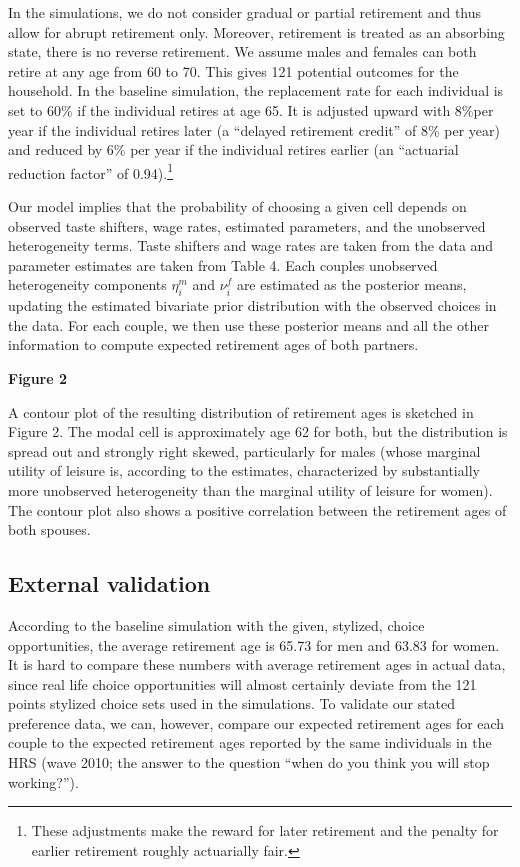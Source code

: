 \documentclass[11pt,letter]{article}
\begin{document}
\par  In the simulations, we do not consider gradual or partial retirement and thus allow for abrupt retirement only. Moreover, retirement is treated as an absorbing state, there is no reverse retirement. We assume males and females can both retire at any age from 60 to 70. This gives 121 potential outcomes for the household. In the baseline simulation, the replacement rate for each individual is set to 60\% if the individual retires at age 65. It is adjusted upward with 8\%per year if the individual retires later (a ``delayed retirement credit'' of 8\% per year) and reduced by 6\% per year if the individual retires earlier (an ``actuarial reduction factor'' of 0.94).\footnote{These adjustments make the reward for later retirement and the penalty for earlier retirement roughly actuarially fair.}

Our model implies that the probability of choosing a given cell depends on observed taste shifters, wage rates, estimated parameters, and the unobserved heterogeneity terms. Taste shifters and wage rates are taken from the data and parameter estimates are taken from Table 4. Each couples unobserved heterogeneity components $\eta_i^m$ and $\nu_i^f$ are estimated as the posterior means, updating the estimated bivariate prior distribution with the observed choices in the data. For each couple, we then use these posterior means and all the other information to compute expected retirement ages of both partners.


\begin{center}
\textbf{Figure 2}
\end{center}

A contour plot of the resulting distribution of retirement ages is sketched in Figure 2. The modal cell is approximately age 62 for both, but the distribution is spread out and strongly right skewed, particularly for males (whose marginal utility of leisure is, according to the estimates, characterized by substantially more unobserved heterogeneity than the marginal utility of leisure for women). The contour plot also shows a positive correlation between the retirement ages of both spouses.

\subsection*{External validation}
According to the baseline simulation with the given, stylized, choice opportunities, the average retirement age is 65.73 for men and 63.83 for women. It is hard to compare these numbers with average retirement ages in actual data, since real life choice opportunities will almost certainly deviate from the 121 points stylized choice sets used in the simulations. To validate our stated preference data, we can, however, compare our expected retirement ages for each couple to the expected retirement ages reported by the same individuals in the HRS (wave 2010; the answer to the question ``when do you think you will stop working?'').
\end{document}
